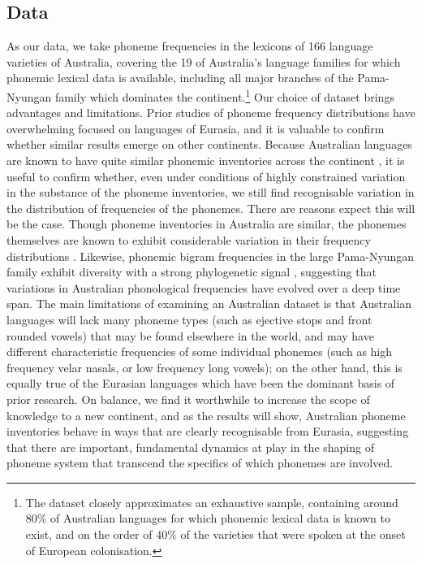 \hypertarget{phon-freq-data}{%
\subsection{Data}\label{phon-freq-data}}

As our data, we take phoneme frequencies in the lexicons of 166 language varieties of Australia, covering the 19 of Australia's language families for which phonemic lexical data is available, including all major branches of the Pama-Nyungan family which dominates the continent.\footnote{The dataset closely approximates an exhaustive sample, containing around 80\% of Australian languages for which phonemic lexical data is known to exist, and on the order of 40\% of the varieties that were spoken at the onset of European colonisation.} Our choice of dataset brings advantages and limitations. Prior studies of phoneme frequency distributions have overwhelming focused on languages of Eurasia, and it is valuable to confirm whether similar results emerge on other continents. Because Australian languages are known to have quite similar phonemic inventories across the continent \autocites{capell_new_1956}{dixon_languages_1980}{busby_distribution_1982}{hamilton_phonetic_1996}{baker_word_2014}{round_phonemic_2019}{round_segment_2021}, it is useful to confirm whether, even under conditions of highly constrained variation in the substance of the phoneme inventories, we still find recognisable variation in the distribution of frequencies of the phonemes. There are reasons expect this will be the case. Though phoneme inventories in Australia are similar, the phonemes themselves are known to exhibit considerable variation in their frequency distributions \autocites{gasser_revisiting_2014}{macklin-cordes_high-definition_2015}. Likewise, phonemic bigram frequencies in the large Pama-Nyungan family exhibit diversity with a strong phylogenetic signal \autocite[]{macklin-cordes_phylogenetic_2021}, suggesting that variations in Australian phonological frequencies have evolved over a deep time span. The main limitations of examining an Australian dataset is that Australian languages will lack many phoneme types (such as ejective stops and front rounded vowels) that may be found elsewhere in the world, and may have different characteristic frequencies of some individual phonemes (such as high frequency velar nasals, or low frequency long vowels); on the other hand, this is equally true of the Eurasian languages which have been the dominant basis of prior research. On balance, we find it worthwhile to increase the scope of knowledge to a new continent, and as the results will show, Australian phoneme inventories behave in ways that are clearly recognisable from Eurasia, suggesting that there are important, fundamental dynamics at play in the shaping of phoneme system that transcend the specifics of which phonemes are involved.

